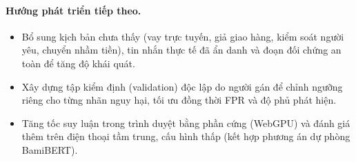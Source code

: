 \paragraph{Hướng phát triển tiếp theo.}
\begin{itemize}
  \item Bổ sung kịch bản chưa thấy (vay trực tuyến, giả giao hàng, kiểm soát người yêu, chuyển nhầm tiền), tin
        nhắn thực tế đã ẩn danh và đoạn đối chứng an toàn để tăng độ khái quát.
  \item Xây dựng tập kiểm định (validation) độc lập do người gán để chỉnh ngưỡng riêng cho từng nhãn
        nguy hại, tối ưu đồng thời FPR và độ phủ phát hiện.
  \item Tăng tốc suy luận trong trình duyệt bằng phần cứng (WebGPU) và đánh giá thêm trên điện thoại
        tầm trung, cấu hình thấp (kết hợp phương án dự phòng BamiBERT).
\end{itemize}
